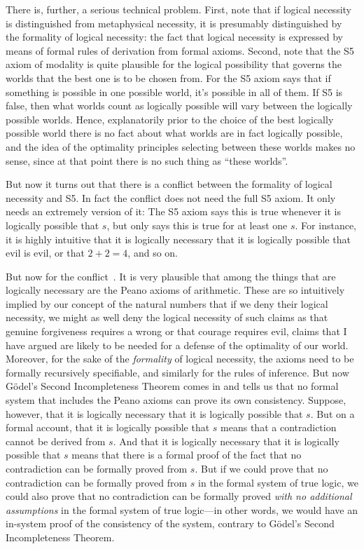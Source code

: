 There is, further, a serious technical problem. First, note that if logical necessity is distinguished from metaphysical necessity, it is presumably distinguished by the formality of logical necessity: the fact that logical necessity is expressed by means of 
formal rules of derivation from formal axioms. Second, note that the S5 axiom of modality is quite plausible for the
logical possibility that governs the worlds that the best one is to be chosen from. For the S5 axiom says that if something is possible 
in one possible world, it's possible in all of them. If S5 is false, then what worlds count as logically possible  
will vary between the logically possible worlds. Hence, explanatorily prior to the choice of the best logically possible world there is no fact about what worlds are in fact logically possible, and the idea of the optimality  principles selecting between these worlds makes no sense, since at that point there is no such thing as ``these worlds''. 

But now it turns out that there is a conflict between the formality of logical necessity and S5.
In fact the conflict does not need the full S5 axiom. It only needs 
an extremely version of it:
The S5 axiom says this is true whenever it is logically possible that $s$, but  only says this is true 
for at least one $s$. For instance, it is highly intuitive that it is logically necessary that it is logically possible 
that evil is evil, or that $2+2=4$, and so on.

But now for the conflict~\parencite{PrussConsistency}. It is very plausible that among the things that are logically necessary are the Peano axioms of 
arithmetic. These are so intuitively implied by our concept of the natural numbers that if we deny their logical necessity,
we might as well deny the logical necessity of such claims as that genuine forgiveness requires a wrong or that courage 
requires evil, claims that I have argued are likely to be needed for a defense of the optimality of our world. Moreover, for
the sake of the \textit{formality} of logical necessity, the axioms need to be formally recursively specifiable, and similarly
for the rules of inference. But now G\"odel's Second Incompleteness Theorem comes in and tells us that no formal system 
that includes the Peano axioms can prove its own consistency. Suppose, however, that it is logically necessary that it is 
logically possible that $s$. But on a formal account, that it is logically possible that $s$ means that a contradiction
cannot be derived from $s$. And that it is logically necessary that it is logically possible that $s$ means that there is 
a formal proof of the fact that no contradiction can be formally proved from $s$. But if we could prove that no 
contradiction can be formally proved from $s$ in the formal system of true logic, we could also prove that no 
contradiction can be formally proved \textit{with no additional assumptions} in the formal system of true logic---in other words,
we would have an in-system proof of the consistency of the system, contrary to G\"odel's Second Incompleteness Theorem.

